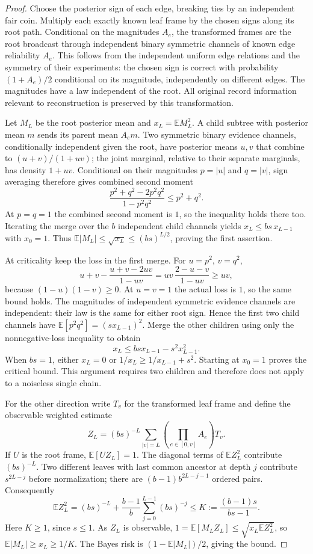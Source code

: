 \documentclass[11pt,a4paper]{article}
\newcommand{\E}{\mathbb E}
\begin{document}
\begin{proof}
Choose the posterior sign of each edge, breaking ties by an independent fair coin. Multiply each exactly known leaf frame by the chosen signs along its root path. Conditional on the magnitudes $A_e$, the transformed frames are the root broadcast through independent binary symmetric channels of known edge reliability $A_e$. This follows from the independent uniform edge relations and the symmetry of their experiments: the chosen sign is correct with probability $(1+A_e)/2$ conditional on its magnitude, independently on different edges. The magnitudes have a law independent of the root. All original record information relevant to reconstruction is preserved by this transformation.

Let $M_L$ be the root posterior mean and $x_L=\E M_L^2$. A child subtree with posterior mean $m$ sends its parent mean $A_em$. Two symmetric binary evidence channels, conditionally independent given the root, have posterior means $u,v$ that combine to $(u+v)/(1+uv)$; the joint marginal, relative to their separate marginals, has density $1+uv$. Conditional on their magnitudes $p=|u|$ and $q=|v|$, sign averaging therefore gives combined second moment
\[
 \frac{p^2+q^2-2p^2q^2}{1-p^2q^2}\le p^2+q^2.
\]
At $p=q=1$ the combined second moment is $1$, so the inequality holds there too. Iterating the merge over the $b$ independent child channels yields $x_L\le bs\,x_{L-1}$ with $x_0=1$. Thus $\E|M_L|\le\sqrt{x_L}\le(bs)^{L/2}$, proving the first assertion.

At criticality keep the loss in the first merge. For $u=p^2$, $v=q^2$,
\[
 u+v-\frac{u+v-2uv}{1-uv}
   =uv\,\frac{2-u-v}{1-uv}\ge uv,
\]
because $(1-u)(1-v)\ge0$. At $u=v=1$ the actual loss is $1$, so the same bound holds. The magnitudes of independent symmetric evidence channels are independent: their law is the same for either root sign. Hence the first two child channels have $\E[p^2q^2]=(s x_{L-1})^2$. Merge the other children using only the nonnegative-loss inequality to obtain
\[
 x_L\le bs x_{L-1}-s^2x_{L-1}^2.
\]
When $bs=1$, either $x_L=0$ or $1/x_L\ge1/x_{L-1}+s^2$. Starting at $x_0=1$ proves the critical bound. This argument requires two children and therefore does not apply to a noiseless single chain.

For the other direction write $T_v$ for the transformed leaf frame and define the observable weighted estimate
\[
 Z_L=(bs)^{-L}\sum_{|v|=L}\left(\prod_{e\in[0,v]}A_e\right)T_v.
\]
If $U$ is the root frame, $\E[UZ_L]=1$. The diagonal terms of $\E Z_L^2$ contribute $(bs)^{-L}$. Two different leaves with last common ancestor at depth $j$ contribute $s^{2L-j}$ before normalization; there are $(b-1)b^{2L-j-1}$ ordered pairs. Consequently
\[
 \E Z_L^2=(bs)^{-L}+\frac{b-1}{b}\sum_{j=0}^{L-1}(bs)^{-j}
 \le K:=\frac{(b-1)s}{bs-1}.
\]
Here $K\ge1$, since $s\le1$. As $Z_L$ is observable, $1=\E[M_LZ_L]\le\sqrt{x_L\E Z_L^2}$, so $\E|M_L|\ge x_L\ge1/K$. The Bayes risk is $(1-\E|M_L|)/2$, giving the bound.
\end{proof}
\end{document}
